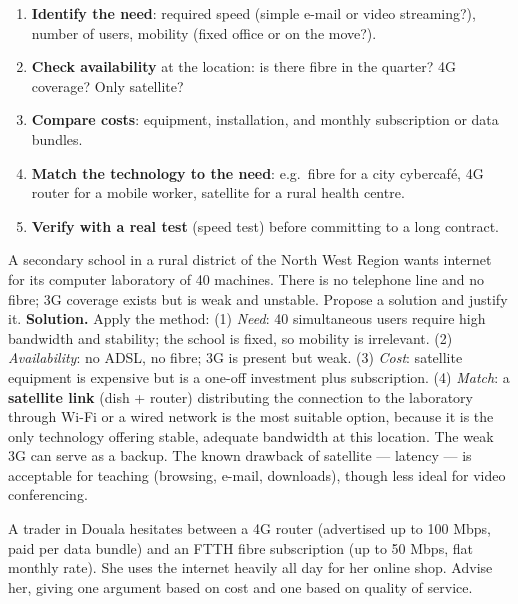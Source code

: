 \documentclass[11pt]{article}
\begin{document}
\begin{methode}
\begin{enumerate}
\item \textbf{Identify the need}: required speed (simple e-mail or video streaming?), number of users, mobility (fixed office or on the move?).
\item \textbf{Check availability} at the location: is there fibre in the quarter? 4G coverage? Only satellite?
\item \textbf{Compare costs}: equipment, installation, and monthly subscription or data bundles.
\item \textbf{Match the technology to the need}: e.g.\ fibre for a city cybercafé, 4G router for a mobile worker, satellite for a rural health centre.
\item \textbf{Verify with a real test} (speed test) before committing to a long contract.
\end{enumerate}
\end{methode}

\begin{exoresolu}
A secondary school in a rural district of the North West Region wants internet for its computer laboratory of 40 machines. There is no telephone line and no fibre; 3G coverage exists but is weak and unstable. Propose a solution and justify it.
\tcblower
\textbf{Solution.} Apply the method: (1) \emph{Need}: 40 simultaneous users require high bandwidth and stability; the school is fixed, so mobility is irrelevant. (2) \emph{Availability}: no ADSL, no fibre; 3G is present but weak. (3) \emph{Cost}: satellite equipment is expensive but is a one-off investment plus subscription. (4) \emph{Match}: a \textbf{satellite link} (dish + router) distributing the connection to the laboratory through Wi-Fi or a wired network is the most suitable option, because it is the only technology offering stable, adequate bandwidth at this location. The weak 3G can serve as a backup. The known drawback of satellite --- latency --- is acceptable for teaching (browsing, e-mail, downloads), though less ideal for video conferencing.
\end{exoresolu}

\begin{exercice}
A trader in Douala hesitates between a 4G router (advertised up to 100 Mbps, paid per data bundle) and an FTTH fibre subscription (up to 50 Mbps, flat monthly rate). She uses the internet heavily all day for her online shop. Advise her, giving one argument based on cost and one based on quality of service.
\end{exercice}
\end{document}
